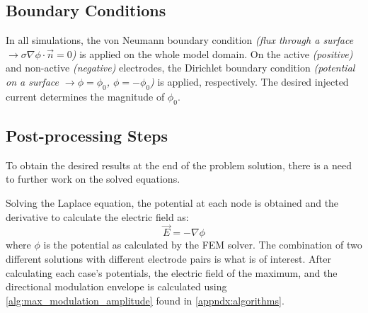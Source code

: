 \subsection{Boundary Conditions}
\label{subsec:solver_boundary_conditions}

In all simulations, the von Neumann boundary condition \textit{(flux through a surface $\rightarrow\sigma\nabla\phi\cdot\vec{n} = 0$)} is applied on the whole model domain. On the active \textit{(positive)} and non-active \textit{(negative)} electrodes, the Dirichlet boundary condition \textit{(potential on a surface $\rightarrow\phi = \phi_0$, $\phi = -\phi_0$)} is applied, respectively. The desired injected current determines the magnitude of $\phi_0$.

\subsection{Post-processing Steps}

To obtain the desired results at the end of the problem solution, there is a need to further work on the solved equations.

Solving the Laplace equation, the potential at each node is obtained and the derivative to calculate the electric field as:
\begin{equation}
	\vec{E} = -\nabla\phi
\end{equation}
where $\phi$ is the potential as calculated by the \gls{FEM} solver. The combination of two different solutions with different electrode pairs is what is of interest. After calculating each case's potentials, the electric field of the maximum, and the directional modulation envelope is calculated using \autoref{alg:max_modulation_amplitude} found in \autoref{appndx:algorithms}.
